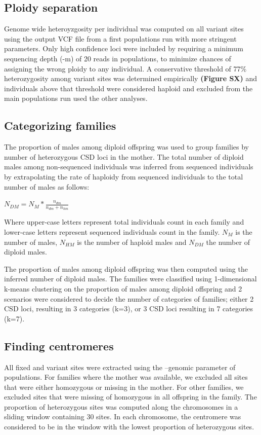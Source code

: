 \documentclass[11pt,a4paper]{report}
\begin{document}
\subsection*{Ploidy separation}
Genome wide heteroyzgosity per individual was computed on all variant sites using the output VCF file from a first populations run with more stringent parameters. Only high confidence loci were included by requiring a minimum sequencing depth (-m) of 20 reads in populations, to minimize chances of assigning the wrong ploidy to any individual. A conservative threshold of 77\% heterozygosity among variant sites was determined empirically \textbf{(Figure SX)} and individuals above that threshold were considered haploid and excluded from the main populations run used the other analyses.

\subsection*{Categorizing families}
The proportion of males among diploid offspring was used to group families by number of heterozygous CSD loci in the mother. The total number of diploid males among non-sequenced individuals was inferred from sequenced individuals by extrapolating the rate of haploidy from sequenced individuals to the total number of males as follows:
\begin{center}
$N_{DM}=N_M*\frac{n_{dm}}{n_{dm}+n_{hm}}$\\
\end{center}
Where upper-case letters represent total individuals count in each family and lower-case letters represent sequenced individuals count in the family. $N_M$ is the number of males, $N_{HM}$ is the number of haploid males and $N_{DM}$ the number of diploid males.

The proportion of males among diploid offspring was then computed using the inferred number of diploid males. The families were classified using 1-dimensional k-means clustering on the proportion of males among diploid offspring and 2 scenarios were considered to decide the number of categories of families; either 2 CSD loci, resulting in 3 categories (k=3), or 3 CSD loci resulting in 7 categories (k=7).\\

\subsection*{Finding centromeres}
All fixed and variant sites were extracted using the --genomic parameter of populations. For families where the mother was available, we excluded all sites that were either homozygous or missing in the mother. For other families, we excluded sites that were missing of homozygous in all offspring in the family. 
The proportion of heterozygous sites was computed along the chromosomes in a sliding window containing 30 sites. In each chromosome, the centromere was considered to be in the window with the lowest proportion of heterozygous sites.
\end{document}
